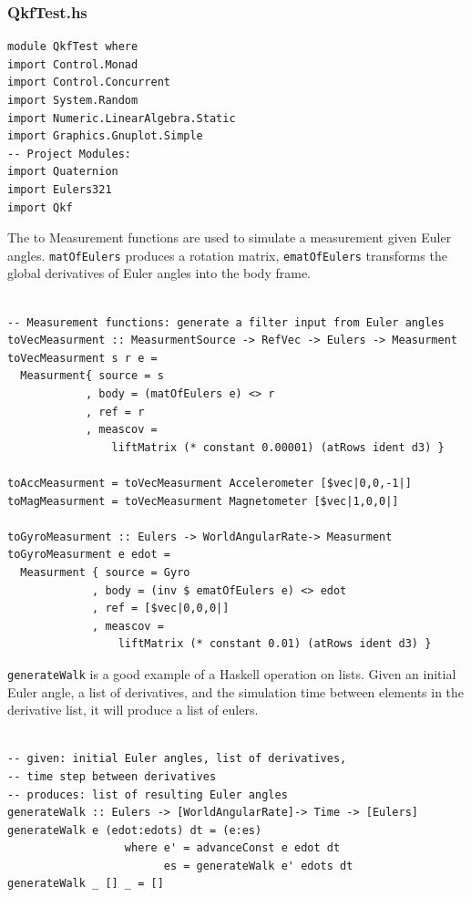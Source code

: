 \documentclass[12pt]{report}
\begin{document}
\subsubsection{QkfTest.hs}

\begin{lstlisting}
module QkfTest where
import Control.Monad
import Control.Concurrent
import System.Random
import Numeric.LinearAlgebra.Static
import Graphics.Gnuplot.Simple
-- Project Modules:
import Quaternion
import Eulers321
import Qkf

\end{lstlisting}
The to Measurement functions are used to simulate a measurement given Euler angles. \lstinline$matOfEulers$ produces a rotation matrix, \lstinline$ematOfEulers$ transforms the global derivatives of Euler angles into the body frame. 
\begin{lstlisting}

-- Measurement functions: generate a filter input from Euler angles
toVecMeasurment :: MeasurmentSource -> RefVec -> Eulers -> Measurment
toVecMeasurment s r e = 
  Measurment{ source = s
            , body = (matOfEulers e) <> r
            , ref = r
            , meascov = 
                liftMatrix (* constant 0.00001) (atRows ident d3) }

toAccMeasurment = toVecMeasurment Accelerometer [$vec|0,0,-1|] 
toMagMeasurment = toVecMeasurment Magnetometer [$vec|1,0,0|] 

toGyroMeasurment :: Eulers -> WorldAngularRate-> Measurment
toGyroMeasurment e edot = 
  Measurment { source = Gyro
             , body = (inv $ ematOfEulers e) <> edot 
             , ref = [$vec|0,0,0|]
             , meascov = 
                 liftMatrix (* constant 0.01) (atRows ident d3) }

\end{lstlisting}
\lstinline$generateWalk$ is a good example of a Haskell operation on lists. Given an initial Euler angle, a list of derivatives, and the simulation time between elements in the derivative list, it will produce a list of eulers.
\begin{lstlisting}

-- given: initial Euler angles, list of derivatives, 
-- time step between derivatives
-- produces: list of resulting Euler angles
generateWalk :: Eulers -> [WorldAngularRate]-> Time -> [Eulers]
generateWalk e (edot:edots) dt = (e:es)
                  where e' = advanceConst e edot dt
                        es = generateWalk e' edots dt
generateWalk _ [] _ = []

\end{lstlisting}
\end{document}

